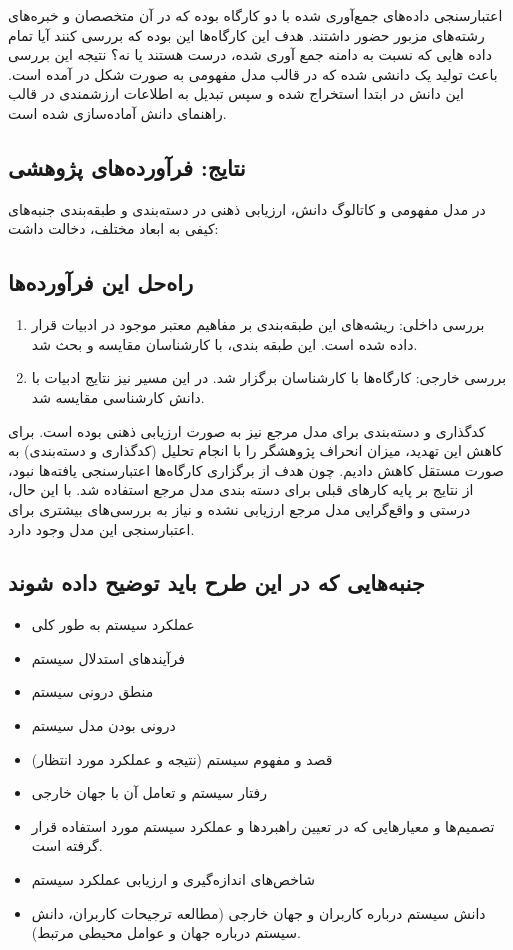 اعتبارسنجی داده‌های جمع‌آوری شده با دو کارگاه بوده که در آن متخصصان و خبره‌های
رشته‌های مزبور حضور داشتند. هدف این کارگاه‌ها این بوده که بررسی کنند آیا تمام
داده هایی که نسبت به دامنه جمع آوری شده، درست هستند یا نه؟ نتیجه این بررسی باعث
تولید یک دانشی شده که در قالب مدل مفهومی به صورت شکل در آمده است. این دانش در
ابتدا استخراج شده و سپس تبدیل به اطلاعات ارزشمندی در قالب راهنمای دانش
آماده‌سازی شده است.

\subsection{نتایج: فرآورده‌های پژوهشی}

در مدل مفهومی و کاتالوگ دانش، ارزیابی ذهنی در دسته‌بندی و طبقه‌بندی جنبه‌های
کیفی به ابعاد مختلف، دخالت داشت:

\subsection{راه‌حل این فرآورده‌ها}

\begin{enumerate}
    \item بررسی داخلی: ریشه‌های این طبقه‌بندی بر مفاهیم معتبر موجود در ادبیات
    قرار داده شده است. این طبقه بندی، با کارشناسان مقایسه و بحث شد. 
    \item بررسی خارجی: کارگاه‌ها با کارشناسان برگزار شد. در این مسیر نیز نتایج
    ادبیات با دانش کارشناسی مقایسه شد.
\end{enumerate}

کدگذاری و دسته‌بندی برای مدل مرجع نیز به صورت ارزیابی ذهنی بوده است. برای کاهش
این تهدید، میزان انحراف پژوهشگر را با انجام تحلیل (کدگذاری و دسته‌بندی) به صورت
مستقل کاهش دادیم. چون هدف از برگزاری کارگاه‌ها اعتبارسنجی یافته‌ها نبود، از
نتایج بر پایه کارهای قبلی برای دسته بندی مدل مرجع استفاده شد. با این حال، درستی
و واقع‌گرایی مدل مرجع ارزیابی نشده و نیاز به بررسی‌های بیشتری برای اعتبارسنجی
این مدل وجود دارد.

\subsection{جنبه‌هایی که در این طرح باید توضیح داده شوند}

\begin{itemize}
    \item عملکرد سیستم به طور کلی
    \item فرآیند‌های استدلال سیستم
    \item منطق درونی سیستم
    \item درونی بودن مدل سیستم
    \item قصد و مفهوم سیستم (نتیجه و عملکرد مورد انتظار)
    \item رفتار سیستم و تعامل آن با جهان خارجی
    \item تصمیم‌ها و معیار‌هایی که در تعیین راهبرد‌ها و عملکرد سیستم مورد
    استفاده قرار گرفته است.
    \item شاخص‌های اندازه‌گیری و ارزیابی عملکرد سیستم
    \item دانش سیستم درباره کاربران و جهان خارجی (مطالعه ترجیحات کاربران، دانش
    سیستم درباره جهان و عوامل محیطی مرتبط).
\end{itemize}

